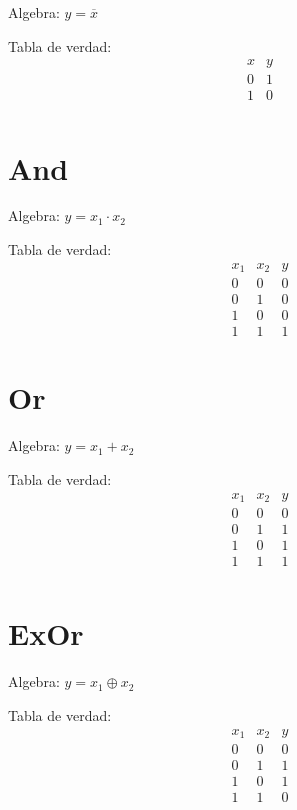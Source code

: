 \documentclass{report}
\begin{document}
Algebra: $y=\overline x$

Tabla de verdad:
$$\begin{array}{c|c}
		x & y \\ \hline
		0 & 1 \\
		1 & 0 \\
	\end{array}$$

\section{And}

Algebra: $y=x_1 \cdot x_2$

Tabla de verdad:
$$\begin{array}{cc|c}
		x_1 & x_2 & y \\ \hline
		0   & 0   & 0 \\
		0   & 1   & 0 \\
		1   & 0   & 0 \\
		1   & 1   & 1
	\end{array}$$


\section{Or}

Algebra: $y=x_1 + x_2$

Tabla de verdad:
$$\begin{array}{cc|c}
		x_1 & x_2 & y \\ \hline
		0   & 0   & 0 \\
		0   & 1   & 1 \\
		1   & 0   & 1 \\
		1   & 1   & 1 \\
	\end{array}$$


\section{ExOr}

Algebra: $y=x_1 \oplus x_2$

Tabla de verdad:
$$\begin{array}{cc|c}
		x_1 & x_2 & y \\ \hline
		0   & 0   & 0 \\
		0   & 1   & 1 \\
		1   & 0   & 1 \\
		1   & 1   & 0 \\
	\end{array}$$
\end{document}
